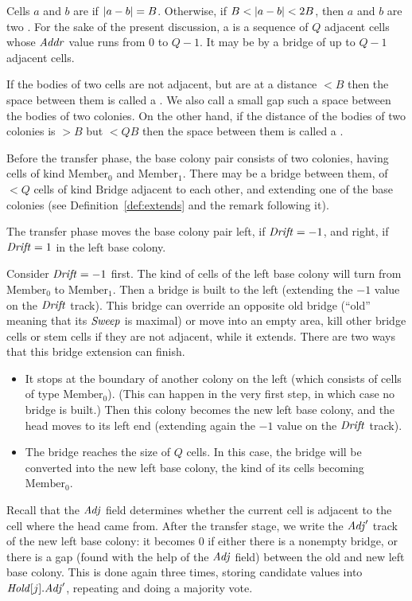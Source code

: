 \documentclass[11pt]{memoir}
\theoremstyle{definition} %
\newcommand{\fld}[1]{\ensuremath{\textit{#1\/}}}
\def\B{B}
\newcommand{\Q}{Q}
\newcommand{\Addr}{\fld{Addr}}
\newcommand{\Drift}{\fld{Drift}}
\newcommand{\Adj}{\fld{Adj}}
\newcommand{\Hold}{\fld{Hold}}
\newcommand{\Sweep}{\fld{Sweep}}
\newcommand{\Bridge}{\mathrm{Bridge}}
\newcommand{\Member}{\mathrm{Member}}
\begin{document}
\begin{definition}\label{def:adjacent}
  Cells \( a \) and \( b \) are  if \( \abs{a-b}=\B \).
  Otherwise, if \( \B < \abs{a- b} < 2\B \), then
  \( a \) and \( b \) are two .
For the sake of the present discussion, a  is a sequence of \( \Q \) adjacent
cells whose \( \Addr \) value runs from \( 0 \) to \( \Q-1 \).
It may be  by a bridge of up to \( \Q-1 \) adjacent cells.

If the bodies of two cells are not adjacent, but are at a distance \( <\B \) then the space
between them is called a .
We also call a small gap such a space between the bodies of two colonies.
On the other hand, if the distance of the bodies of two colonies is \( >\B \) 
but \( <\Q\B \) then the space between them is called a .
\end{definition}

Before the transfer phase, the base colony pair consists of two colonies,
having cells of kind \( \Member_{0} \) and \( \Member_{1} \).
There may be a bridge between them, of \( <\Q \) cells of kind \( \Bridge \)
adjacent to each other, and extending one of the base
colonies (see Definition~\ref{def:extends} and the remark following it).

The transfer phase moves the base colony pair left, if \( \Drift=-1 \), and right, if \( \Drift=1 \)
in the left base colony.

Consider \( \Drift=-1 \) first.
The kind of cells of the left base colony will turn from \( \Member_{0} \) to \( \Member_{1} \).
Then a bridge is built to the left (extending the \( -1 \) value on the \( \Drift \) track).
This bridge can override an opposite old bridge (``old'' meaning 
that its \( \Sweep \) is maximal) or move 
into an empty area, kill other bridge cells or stem cells if they are not adjacent, while it extends.
There are two ways that this bridge extension can finish.
\begin{itemize}
\item It stops at the boundary of another colony on the left
  (which consists of cells of type \( \Member_{0} \)).
  (This can happen in the very first step, in which case no bridge is built.)
  Then this colony becomes the new left base colony, and the head moves to its left end
  (extending again the \( -1 \) value on the \( \Drift \)  track).
  
\item The bridge reaches the size of \( \Q \) cells.
  In this case, the bridge will be converted into the new left base colony, the kind of its cells
  becoming \( \Member_{0} \).
  \end{itemize}
Recall that the \( \Adj \) field determines
whether the current cell is adjacent to the cell  where the head came from.
After the transfer stage, we write the \( \Adj' \) track of the
new left base colony: it becomes \( 0 \) if either there is a nonempty bridge,
or there is a gap (found with the help of the \( \Adj \) field) between the old and new left base colony.
This is done again three times, storing candidate values into \( \Hold[j].\Adj' \),
repeating and doing a majority vote.
\end{document}

